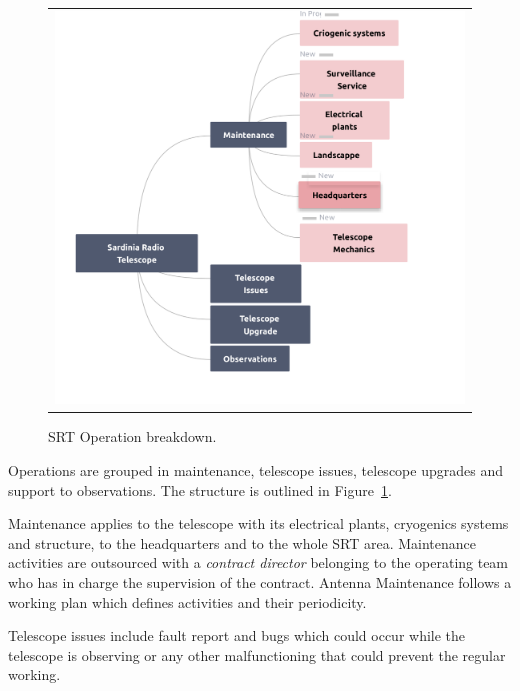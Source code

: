 \documentclass[a4paper]{spie}  %
\begin{document}
  \begin{figure} [ht]
   \begin{center}
   \begin{tabular}{c} 
   \includegraphics[width=\textwidth]{srt_wbs.png}
	\end{tabular}
	\end{center}
   \caption[example] 
   { \label{fig:wbs} SRT Operation breakdown.}

   \end{figure} 
Operations are grouped in maintenance, telescope issues, telescope upgrades and support to observations. The structure is outlined in Figure~\ref{fig:wbs}. 

Maintenance applies to the telescope with its electrical plants, cryogenics systems and structure, to the  headquarters and to the whole SRT area. Maintenance activities are  outsourced with 
a \textit{contract director} belonging to the operating team who has in charge the supervision of the contract.   
Antenna Maintenance follows a working plan which defines activities and their periodicity. 

Telescope issues include fault report and bugs which could occur while the telescope is observing or any other malfunctioning that could prevent the regular working. 
\end{document}
